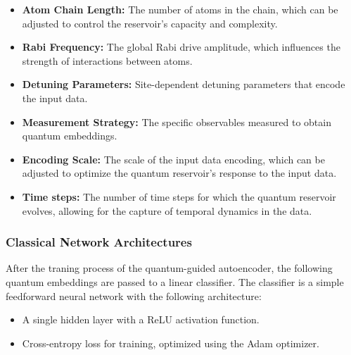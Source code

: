 \documentclass[conference]{IEEEtran}
\begin{document}
\begin{itemize}
    \item \textbf{Atom Chain Length:} 
    The number of atoms in the chain, which can be adjusted 
    to control the reservoir's capacity and complexity.
    
    \item \textbf{Rabi Frequency:} 
    The global Rabi drive amplitude, which influences the 
    strength of interactions between atoms.
    
    \item \textbf{Detuning Parameters:} 
    Site-dependent detuning parameters that encode the input data.
    
    \item \textbf{Measurement Strategy:} 
    The specific observables measured to obtain quantum embeddings.

    \item \textbf{Encoding Scale:}
    The scale of the input data encoding, which can be adjusted
    to optimize the quantum reservoir's response to the input data.

    \item \textbf{Time steps:}
    The number of time steps for which the quantum reservoir evolves,
    allowing for the capture of temporal dynamics in the data.
\end{itemize}

\subsubsection{Classical Network Architectures}
After the traning process of the quantum-guided autoencoder,
the following quantum embeddings are passed to a linear classifier.
The classifier is a simple feedforward neural network with the following architecture:
\begin{itemize}
    \item A single hidden layer with a ReLU activation function.
    \item Cross-entropy loss for training, optimized using the Adam optimizer.
\end{itemize}
\end{document}
